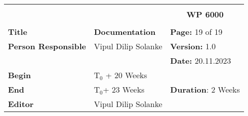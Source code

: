 \begin{table}[!h]
  \begin{center}
    \begin{tabular}{|p{35mm}||p{55mm}|p{50mm}||p{40mm}|}
      \hline
      \multicolumn{3}{|l||}{\textbf{}} & \multicolumn{1}{c|}{}                                                                                                                                                \\
      \multicolumn{3}{|l||}{\textbf{}} & \multicolumn{1}{c|}{\textbf{WP 6000}}                                                                                                                                \\
      \multicolumn{3}{|l||}{\textbf{}} & \multicolumn{1}{c|}{}                                                                                                                                                \\
      \hline\hline
      \textbf{Title}                   & \multicolumn{2}{p{7cm}||}{\textbf{Documentation}}
                                       & \textbf{Page:} 19 of 19                                                                                                                                             \\
      \hline
      \textbf{Person Responsible}        & \multicolumn{2}{l||}{Vipul Dilip Solanke}                                                                                                   & \textbf{Version:} 1.0   \\
      \hline
      \multicolumn{3}{|l||}{}          & \textbf{Date:} 20.11.2023                                                                                                                                          \\
      \hline\hline
      \textbf{Begin}                  & \multicolumn{2}{l||}{T$_0$ + 20 Weeks}                                                                                                                &                         \\
      \hline
      \textbf{End}                    & \multicolumn{2}{l||}{T$_0$+ 23 Weeks}                                                                                                        & \textbf{Duration}: 2 Weeks \\
      \hline\hline
      \textbf{Editor}              & \multicolumn{3}{l|}{Vipul Dilip Solanke}                                                                                                                              \\

\end{tabular}
\end{center}
\end{table}
